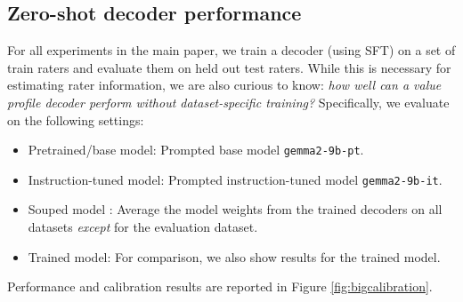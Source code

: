 \documentclass[11pt]{article}
\begin{document}
\subsection{Zero-shot decoder performance}

For all experiments in the main paper, we train a decoder (using SFT) on a set of train raters and evaluate them on held out test raters.
While this is necessary for estimating rater information,
we are also curious to know: \textit{how well can a value profile decoder perform without dataset-specific training?}
Specifically, we evaluate on the following settings:
\begin{itemize}
\item Pretrained/base model: Prompted base model \texttt{gemma2-9b-pt}.
\item Instruction-tuned model: Prompted instruction-tuned model \texttt{gemma2-9b-it}.
\item Souped model \citep{wortsman2022modelsoupsaveragingweights}: Average the model weights from the trained decoders on all datasets \textit{except} for the evaluation dataset.
\item Trained model: For comparison, we also show results for the trained model.
\end{itemize}
Performance and calibration results are reported in Figure \ref{fig:bigcalibration}.
\end{document}
